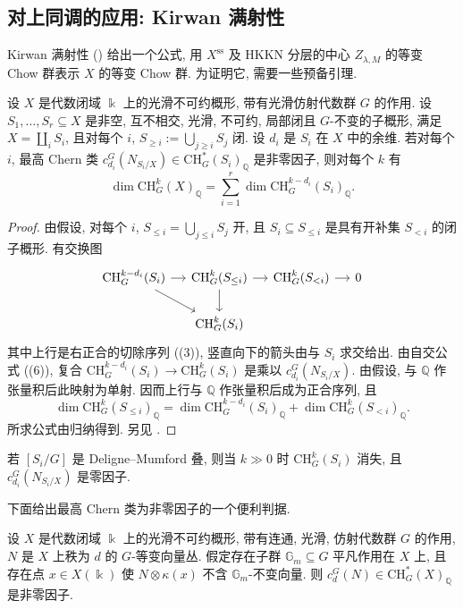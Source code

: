 \subsection{对上同调的应用: Kirwan 满射性}\label{src:8.7.3-subsection}
Kirwan 满射性 () 给出一个公式, 用 $X^{\mathrm{ss}}$ 及 HKKN 分层的中心 $Z_{\lambda,M}$ 的等变 Chow 群表示 $X$ 的等变 Chow 群. 为证明它, 需要一些预备引理.
\begin{lemma}\label{src:8.7.9}
设 $X$ 是代数闭域 $\Bbbk$ 上的光滑不可约概形, 带有光滑仿射代数群 $G$ 的作用. 设 $S_1,\ldots,S_r\subseteq X$ 是非空, 互不相交, 光滑, 不可约, 局部闭且 $G$-不变的子概形, 满足 $X=\coprod_iS_i$, 且对每个 $i$, $S_{\geq i}:=\bigcup_{j\geq i}S_j$ 闭. 设 $d_i$ 是 $S_i$ 在 $X$ 中的余维. 若对每个 $i$, 最高 Chern 类 $c_{d_i}^G(N_{S_i/X})\in\mathrm{CH}_G^*(S_i)_{\mathbb Q}$ 是非零因子, 则对每个 $k$ 有
\[
\dim\mathrm{CH}_G^k(X)_{\mathbb Q}=\sum_{i=1}^r\dim\mathrm{CH}_G^{k-d_i}(S_i)_{\mathbb Q}.
\]
\end{lemma}
\begin{proof}
由假设, 对每个 $i$, $S_{\leq i}=\bigcup_{j\leq i}S_j$ 开, 且 $S_i\subseteq S_{\leq i}$ 是具有开补集 $S_{<i}$ 的闭子概形. 有交换图
\[
\begin{tikzcd}[ampersand replacement=\&,column sep=small]
\mathrm{CH}_G^{k-d_i}(S_i)\arrow[r]\arrow[dr]\&\mathrm{CH}_G^k(S_{\leq i})\arrow[r]\arrow[d]\&\mathrm{CH}_G^k(S_{<i})\arrow[r]\&0\\
\&\mathrm{CH}_G^k(S_i)\&\&
\end{tikzcd}
\]
其中上行是右正合的切除序列 ((3)), 竖直向下的箭头由与 $S_i$ 求交给出. 由自交公式 ((6)), 复合 $\mathrm{CH}_G^{k-d_i}(S_i)\to\mathrm{CH}_G^k(S_i)$ 是乘以 $c_{d_i}^G(N_{S_i/X})$. 由假设, 与 $\mathbb Q$ 作张量积后此映射为单射. 因而上行与 $\mathbb Q$ 作张量积后成为正合序列, 且
\[
\dim\mathrm{CH}_G^k(S_{\leq i})_{\mathbb Q}=\dim\mathrm{CH}_G^{k-d_i}(S_i)_{\mathbb Q}+\dim\mathrm{CH}_G^k(S_{<i})_{\mathbb Q}.
\]
所求公式由归纳得到. 另见 \cite[命题 1.9]{AB83}.
\end{proof}
\begin{remark}\label{src:8.7.10}
若 $[S_i/G]$ 是 Deligne--Mumford 叠, 则当 $k\gg0$ 时 $\mathrm{CH}_G^k(S_i)$ 消失, 且 $c_{d_i}^G(N_{S_i/X})$ 是零因子.
\end{remark}
下面给出最高 Chern 类为非零因子的一个便利判据.
\begin{lemma}\label{src:8.7.11}
设 $X$ 是代数闭域 $\Bbbk$ 上的光滑不可约概形, 带有连通, 光滑, 仿射代数群 $G$ 的作用, $N$ 是 $X$ 上秩为 $d$ 的 $G$-等变向量丛. 假定存在子群 $\mathbb G_m\subseteq G$ 平凡作用在 $X$ 上, 且存在点 $x\in X(\Bbbk)$ 使 $N\otimes\kappa(x)$ 不含 $\mathbb G_m$-不变向量. 则 $c_d^G(N)\in\mathrm{CH}_G^*(X)_{\mathbb Q}$ 是非零因子.
\end{lemma}
